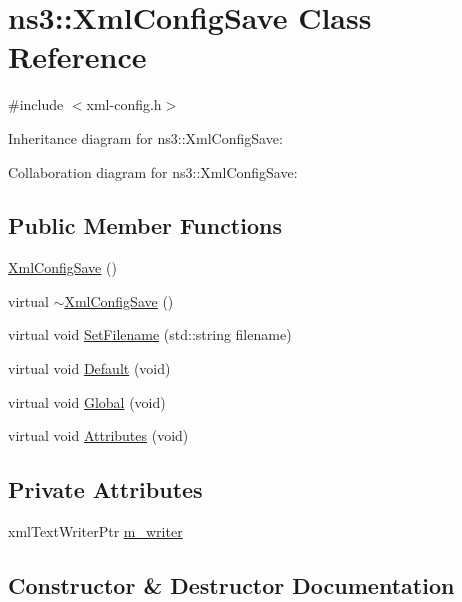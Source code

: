 \hypertarget{classns3_1_1XmlConfigSave}{}\section{ns3\+:\+:Xml\+Config\+Save Class Reference}
\label{classns3_1_1XmlConfigSave}


{\ttfamily \#include $<$xml-\/config.\+h$>$}



Inheritance diagram for ns3\+:\+:Xml\+Config\+Save\+:


Collaboration diagram for ns3\+:\+:Xml\+Config\+Save\+:
\subsection*{Public Member Functions}
\begin{DoxyCompactItemize}
\item 
\hyperlink{classns3_1_1XmlConfigSave_ad0ed8a4dfa238811d21ed712a50aa71f}{Xml\+Config\+Save} ()
\item 
virtual \hyperlink{classns3_1_1XmlConfigSave_a37a422754ff2c612595a6f7c83686a4f}{$\sim$\+Xml\+Config\+Save} ()
\item 
virtual void \hyperlink{classns3_1_1XmlConfigSave_a9a29b814b227311e2411e4a70ae7a714}{Set\+Filename} (std\+::string filename)
\item 
virtual void \hyperlink{classns3_1_1XmlConfigSave_aff821d59cca83bfd659f45d1725055c2}{Default} (void)
\item 
virtual void \hyperlink{classns3_1_1XmlConfigSave_a4cd0df25f4499814bce7a3041c155cc1}{Global} (void)
\item 
virtual void \hyperlink{classns3_1_1XmlConfigSave_a0001e86f35301fd07d54e01299071855}{Attributes} (void)
\end{DoxyCompactItemize}
\subsection*{Private Attributes}
\begin{DoxyCompactItemize}
\item 
xml\+Text\+Writer\+Ptr \hyperlink{classns3_1_1XmlConfigSave_a838ec47c15d124d23133a8e633c40397}{m\+\_\+writer}
\end{DoxyCompactItemize}


\subsection{Constructor \& Destructor Documentation}
